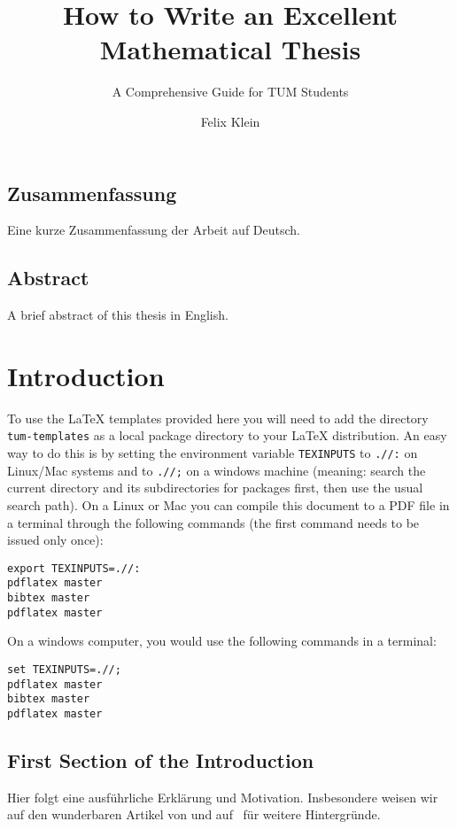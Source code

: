 \documentclass[%
thesis=student,%
coverpage=false,%
titlepage=false,%
headmarks=true, %
english,%
font=libertine, %
math=newpxtx, %
BCOR=5mm,%
coverBCOR=11mm%
]{tumbook}
\title{How to Write an Excellent Mathematical Thesis}
\subtitle{A Comprehensive Guide for TUM Students}
\author{Felix Klein}
\begin{document}
\frontmatter
\maketitle

\section*{Zusammenfassung}
Eine kurze Zusammenfassung der Arbeit auf Deutsch.

\section*{Abstract}
A brief abstract of this thesis in English.

\cleardoublepage{}

\tableofcontents

\mainmatter{}
\chapter{Introduction}

To use the \LaTeX{} templates provided here you will need to add the directory \verb|tum-templates| as a local package directory to your \LaTeX{} distribution. An easy way to do this is by setting the environment variable \verb|TEXINPUTS| to \verb|.//:| on Linux/Mac systems and to \verb|.//;| on a windows machine (meaning: search the current directory and its subdirectories for packages first, then use the usual search path). On a Linux or Mac you can compile this document to a PDF file in a terminal through the following commands (the first command needs to be issued only once):
\begin{verbatim}
export TEXINPUTS=.//:
pdflatex master
bibtex master
pdflatex master
\end{verbatim}

On a windows computer, you would use the following commands in a terminal:

\begin{verbatim}
set TEXINPUTS=.//;
pdflatex master
bibtex master
pdflatex master
\end{verbatim}


\section{First Section of the Introduction}%
\label{sec:first-sect-intr}
Hier folgt eine ausführliche Erklärung und Motivation. Insbesondere weisen wir auf den wunderbaren Artikel von \textcite{Edmonds:1965} und auf~\cite{GareyJohnson:1979} für weitere Hintergründe.
\end{document}
